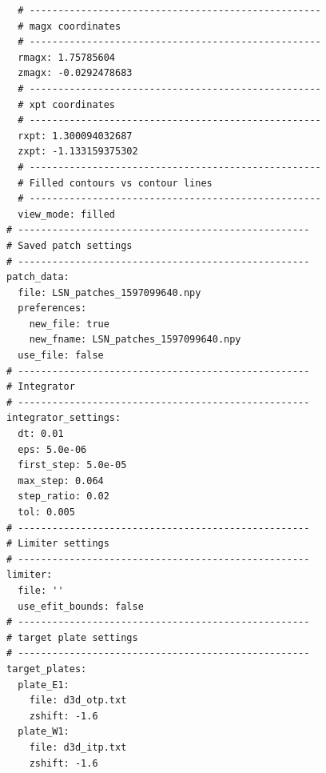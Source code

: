 \begin{lstlisting}
  # ---------------------------------------------------
  # magx coordinates
  # ---------------------------------------------------
  rmagx: 1.75785604
  zmagx: -0.0292478683
  # ---------------------------------------------------
  # xpt coordinates
  # ---------------------------------------------------
  rxpt: 1.300094032687
  zxpt: -1.133159375302
  # ---------------------------------------------------
  # Filled contours vs contour lines
  # ---------------------------------------------------
  view_mode: filled
# ---------------------------------------------------
# Saved patch settings
# ---------------------------------------------------
patch_data:
  file: LSN_patches_1597099640.npy
  preferences:
    new_file: true
    new_fname: LSN_patches_1597099640.npy
  use_file: false
# ---------------------------------------------------
# Integrator
# ---------------------------------------------------
integrator_settings:
  dt: 0.01
  eps: 5.0e-06
  first_step: 5.0e-05
  max_step: 0.064
  step_ratio: 0.02
  tol: 0.005
# ---------------------------------------------------
# Limiter settings
# ---------------------------------------------------
limiter:
  file: ''
  use_efit_bounds: false
# ---------------------------------------------------
# target plate settings
# ---------------------------------------------------
target_plates:
  plate_E1:
    file: d3d_otp.txt
    zshift: -1.6
  plate_W1:
    file: d3d_itp.txt
    zshift: -1.6
\end{lstlisting}

\newpage
